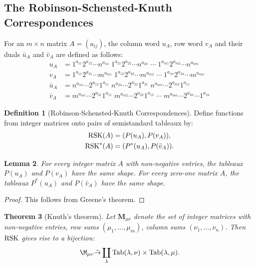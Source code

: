 \documentclass[11pt]{amsart}
\newtheorem{theorem}{Theorem}[subsection]
\newtheorem{lemma}[theorem]{Lemma}
\theoremstyle{definition}
\newtheorem{definition}[theorem]{Definition}
\theoremstyle{example}
\newcommand{\Tab}{\textup{Tab}}
\newcommand{\rsk}{\textup{RSK}}
\begin{document}
\subsection{The Robinson-Schensted-Knuth Correspondences}
\label{sec:rsk}
For an $m\times n$ matrix $A=(a_{ij})$, the column word $u_A$, row word $v_A$ and their duals $\bar u_A$ and $\bar v_A$ are defined as follows:
\begin{align*}
  u_A &= 1^{a_{11}}2^{a_{12}}\dotsb n^{a_{1n}} \; 1^{a_{21}} 2^{a_{22}} \dotsb n^{a_{2n}} \; \dotsb \; 1^{a_{m1}} 2^{a_{m2}} \dotsb n^{a_{mn}}\\
  v_A &= 1^{a_{11}}2^{a_{21}}\dotsb m^{a_{m1}} \; 1^{a_{12}} 2^{a_{22}} \dotsb m^{a_{m2}} \; \dotsb \; 1^{a_{1n}} 2^{a_{2n}} \dotsb m^{a_{mn}}\\
  \bar u_A &= n^{a_{1n}} \dotsb 2^{a_{12}}1^{a_{11}}\; n^{a_{2n}}\dotsb 2^{a_{22}}1^{a_{21}} \; n^{a_{mn}} \dotsb 2^{a_{m2}} 1^{a_{11}}\\
  \bar v _A &= m^{a_{m1}}\dotsb 2^{a_{21}}1^{a_{11}} \; m^{a_{m2}}\dotsb 2^{a_{22}} 1^{a_{12}} \; \dotsb \; m^{a_{mn}}\dotsb  2^{a_{2n}} \dotsb 1^{a_{1n}}
\end{align*}
\begin{definition}
  [Robinson-Schensted-Knuth Correspondences]
  Define functions from integer matrices onto pairs of semistandard tableaux by:
  \begin{align*}
    \rsk(A) & = (P(u_A), P(v_A)),\\
    \rsk^*(A) & = (P^*(u_A), P(\bar v_A)).
  \end{align*}
\end{definition}
\begin{lemma}
  For every integer matrix $A$ with non-negative entries, the tableaux $P(u_A)$ and $P(v_A)$ have the same shape.
  For every zero-one matrix $A$, the tableaux $P^*(u_A)$ and $P(\bar v_A)$ have the same shape.
\end{lemma}
\begin{proof}
  This follows from Greene's theorem.
\end{proof}
\begin{theorem}
  [Knuth's theorem]
  Let $\mathbf M_{\mu\nu}$ denote the set of integer matrices with non-negative entries, row sums $(\mu_1,\dotsc, \mu_m)$, column sums $(\nu_1,\dotsc,\nu_n)$.
  Then $\rsk$ gives rise to a bijection:
  \begin{displaymath}
    \M_{\mu\nu}\tilde\to \coprod_\lambda \Tab(\lambda,\nu)\times \Tab(\lambda,\mu).
  \end{displaymath}
\end{theorem}


\end{document}
